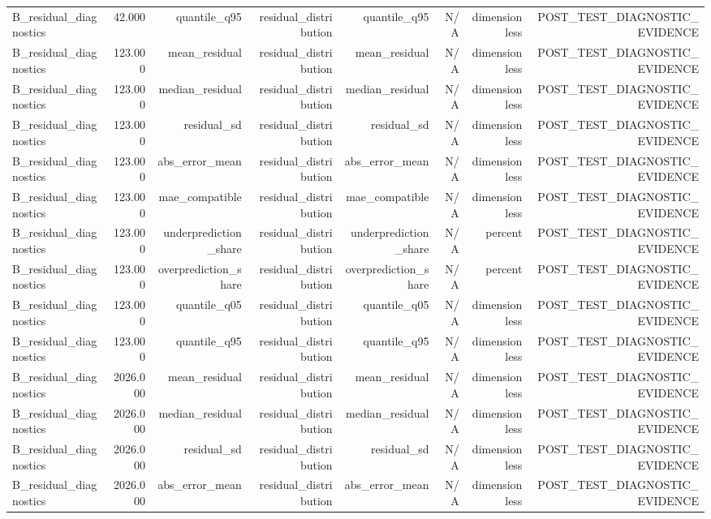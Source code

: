 \begin{table}[h!]
\begin{tabular}{lrrrrrrr}
B\_residual\_diagnostics & 42.000 & quantile\_q95 & residual\_distribution & quantile\_q95 & N/A & dimensionless & POST\_TEST\_DIAGNOSTIC\_EVIDENCE \\
B\_residual\_diagnostics & 123.000 & mean\_residual & residual\_distribution & mean\_residual & N/A & dimensionless & POST\_TEST\_DIAGNOSTIC\_EVIDENCE \\
B\_residual\_diagnostics & 123.000 & median\_residual & residual\_distribution & median\_residual & N/A & dimensionless & POST\_TEST\_DIAGNOSTIC\_EVIDENCE \\
B\_residual\_diagnostics & 123.000 & residual\_sd & residual\_distribution & residual\_sd & N/A & dimensionless & POST\_TEST\_DIAGNOSTIC\_EVIDENCE \\
B\_residual\_diagnostics & 123.000 & abs\_error\_mean & residual\_distribution & abs\_error\_mean & N/A & dimensionless & POST\_TEST\_DIAGNOSTIC\_EVIDENCE \\
B\_residual\_diagnostics & 123.000 & mae\_compatible & residual\_distribution & mae\_compatible & N/A & dimensionless & POST\_TEST\_DIAGNOSTIC\_EVIDENCE \\
B\_residual\_diagnostics & 123.000 & underprediction\_share & residual\_distribution & underprediction\_share & N/A & percent & POST\_TEST\_DIAGNOSTIC\_EVIDENCE \\
B\_residual\_diagnostics & 123.000 & overprediction\_share & residual\_distribution & overprediction\_share & N/A & percent & POST\_TEST\_DIAGNOSTIC\_EVIDENCE \\
B\_residual\_diagnostics & 123.000 & quantile\_q05 & residual\_distribution & quantile\_q05 & N/A & dimensionless & POST\_TEST\_DIAGNOSTIC\_EVIDENCE \\
B\_residual\_diagnostics & 123.000 & quantile\_q95 & residual\_distribution & quantile\_q95 & N/A & dimensionless & POST\_TEST\_DIAGNOSTIC\_EVIDENCE \\
B\_residual\_diagnostics & 2026.000 & mean\_residual & residual\_distribution & mean\_residual & N/A & dimensionless & POST\_TEST\_DIAGNOSTIC\_EVIDENCE \\
B\_residual\_diagnostics & 2026.000 & median\_residual & residual\_distribution & median\_residual & N/A & dimensionless & POST\_TEST\_DIAGNOSTIC\_EVIDENCE \\
B\_residual\_diagnostics & 2026.000 & residual\_sd & residual\_distribution & residual\_sd & N/A & dimensionless & POST\_TEST\_DIAGNOSTIC\_EVIDENCE \\
B\_residual\_diagnostics & 2026.000 & abs\_error\_mean & residual\_distribution & abs\_error\_mean & N/A & dimensionless & POST\_TEST\_DIAGNOSTIC\_EVIDENCE \\

\end{tabular}
\end{table}

